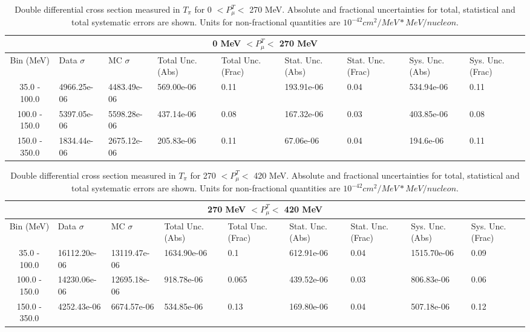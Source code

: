 \begin{table}[!htb]
    \centering
    \tiny
    \begin{tabular}{|c|p{0.5in}|p{0.5in}|p{0.5in}|p{0.5in}|p{0.5in}|p{0.5in}|p{0.5in}|p{0.5in}|}

        \hline
        \multicolumn{9}{c}{0 MeV $ < P^T_\mu < $ 270 MeV}\\
        \hline
        Bin (MeV)& Data $\sigma$ & MC $\sigma$ & Total Unc. (Abs) & Total Unc. (Frac)  & Stat. Unc. (Abs) & Stat. Unc. (Frac) & Sys. Unc. (Abs) & Sys. Unc. (Frac)\\ \hline
35.0 - 100.0 & 4966.25e-06 & 4483.49e-06 & 569.00e-06 & 0.11 & 193.91e-06 & 0.04 & 534.94e-06 & 0.11\\ \hline
100.0 - 150.0 & 5397.05e-06 & 5598.28e-06 & 437.14e-06 & 0.08 & 167.32e-06 & 0.03 & 403.85e-06 & 0.08\\ \hline
150.0 - 350.0 & 1834.44e-06 & 2675.12e-06 & 205.83e-06 & 0.11 & 67.06e-06 & 0.04 & 194.6e-06 & 0.11\\ \hline


    \end{tabular}
    \caption{Double differential cross section measured in $T_\pi$ for 0 $ < P^T_\mu < $ 270 MeV. Absolute and fractional uncertainties for total, statistical and total systematic errors are shown. Units for non-fractional quantities are $10^{-42}cm^2/MeV*MeV/nucleon$.}
    \label{tab:ApdxA:XSecTable2Dtpiptmu1}
\end{table}

\begin{table}[!htb]
    \centering
    \tiny
    \begin{tabular}{|c|p{0.5in}|p{0.5in}|p{0.5in}|p{0.5in}|p{0.5in}|p{0.5in}|p{0.5in}|p{0.5in}|}

        \hline
        \multicolumn{9}{c}{270 MeV $ < P^T_\mu < $ 420 MeV}\\
        \hline
        Bin (MeV)& Data $\sigma$ & MC $\sigma$ & Total Unc. (Abs) & Total Unc. (Frac)  & Stat. Unc. (Abs) & Stat. Unc. (Frac) & Sys. Unc. (Abs) & Sys. Unc. (Frac)\\ \hline
35.0 - 100.0 & 16112.20e-06 & 13119.47e-06 & 1634.90e-06 & 0.1 & 612.91e-06 & 0.04 & 1515.70e-06 & 0.09\\ \hline
100.0 - 150.0 & 14230.06e-06 & 12695.18e-06 & 918.78e-06 & 0.065 & 439.52e-06 & 0.03 & 806.83e-06 & 0.06\\ \hline
150.0 - 350.0 & 4252.43e-06 & 6674.57e-06 & 534.85e-06 & 0.13 & 169.80e-06 & 0.04 & 507.18e-06 & 0.12\\ \hline

    \end{tabular}
    \caption{Double differential cross section measured in $T_\pi$ for 270 $ < P^T_\mu < $ 420 MeV. Absolute and fractional uncertainties for total, statistical and total systematic errors are shown. Units for non-fractional quantities are $10^{-42}cm^2/MeV*MeV/nucleon$.}
    \label{tab:ApdxA:XSecTable2Dtpiptmu2}
\end{table}

